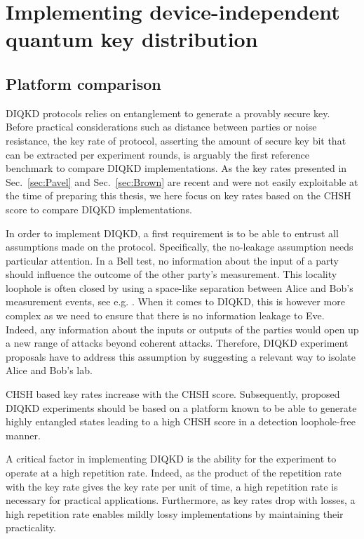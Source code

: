 \chapter{Implementing device-independent quantum key distribution}
\label{chap:implementing_diqkd}

\section{Platform comparison}

DIQKD protocols relies on entanglement to generate a provably secure key.
Before practical considerations such as distance between parties or noise resistance, the key rate of protocol, asserting the amount of secure key bit that can be extracted per experiment rounds, is arguably the first reference benchmark to compare DIQKD implementations.
As the key rates presented in Sec.~\ref{sec:Pavel} and Sec.~\ref{sec:Brown} are recent and were not easily exploitable at the time of preparing this thesis, we here focus on key rates based on the CHSH score to compare DIQKD implementations.

\medbreak

In order to implement DIQKD, a first requirement is to be able to entrust all assumptions made on the protocol.
Specifically, the no-leakage assumption needs particular attention.
In a Bell test, no information about the input of a party should influence the outcome of the other party's measurement.
This locality loophole is often closed by using a space-like separation between Alice and Bob's measurement events, see e.g. \cite{Hensen2015,Giustina2015,Shalm2015}.
When it comes to DIQKD, this is however more complex as we need to ensure that there is no information leakage to Eve.
Indeed, any information about the inputs or outputs of the parties would open up a new range of attacks beyond coherent attacks.
Therefore, DIQKD experiment proposals have to address this assumption by suggesting a relevant way to isolate Alice and Bob's lab.

\medbreak

CHSH based key rates increase with the CHSH score.
Subsequently, proposed DIQKD experiments should be based on a platform known to be able to generate highly entangled states leading to a high CHSH score in a detection loophole-free manner.

\medbreak

A critical factor in implementing DIQKD is the ability for the experiment to operate at a high repetition rate.
Indeed, as the product of the repetition rate with the key rate gives the key rate per unit of time, a high repetition rate is necessary for practical applications.
Furthermore, as key rates drop with losses, a high repetition rate enables mildly lossy implementations by maintaining their practicality.

